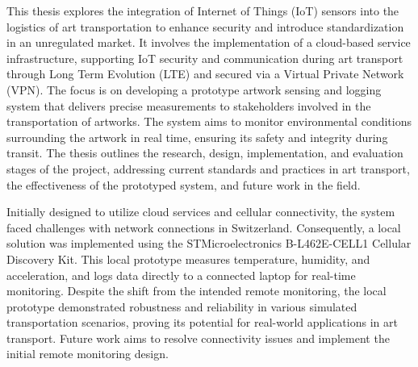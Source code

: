 This thesis explores the integration of Internet of Things (IoT) sensors into the logistics of art transportation to enhance security and introduce standardization in an unregulated market. It involves the implementation of a cloud-based service infrastructure, supporting IoT security and communication during art transport through Long Term Evolution (LTE) and secured via a Virtual Private Network (VPN). The focus is on developing a prototype artwork sensing and logging system that delivers precise measurements to stakeholders involved in the transportation of artworks. The system aims to monitor environmental conditions surrounding the artwork in real time, ensuring its safety and integrity during transit. The thesis outlines the research, design, implementation, and evaluation stages of the project, addressing current standards and practices in art transport, the effectiveness of the prototyped system, and future work in the field.

Initially designed to utilize cloud services and cellular connectivity, the system faced challenges with network connections in Switzerland. Consequently, a local solution was implemented using the STMicroelectronics B-L462E-CELL1 Cellular Discovery Kit. This local prototype measures temperature, humidity, and acceleration, and logs data directly to a connected laptop for real-time monitoring. Despite the shift from the intended remote monitoring, the local prototype demonstrated robustness and reliability in various simulated transportation scenarios, proving its potential for real-world applications in art transport. Future work aims to resolve connectivity issues and implement the initial remote monitoring design.